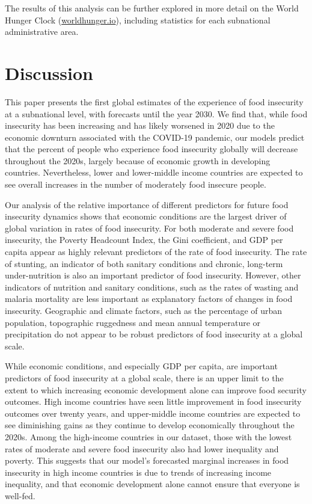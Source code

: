 \documentclass[titlepage]{article}
\begin{document}
The results of this analysis can be further explored in more detail on the World Hunger Clock (\href{https://worldhunger.io}{worldhunger.io}), including statistics for each subnational administrative area.

\section{Discussion}
This paper presents the first global estimates of the experience of food insecurity at a subnational level, with forecasts until the year 2030.  We find that, while food insecurity has been increasing and has likely worsened in 2020 due to the economic downturn associated with the COVID-19 pandemic, our models predict that the percent of people who experience food insecurity globally will decrease throughout the 2020s, largely because of economic growth in developing countries.  Nevertheless, lower and lower-middle income countries are expected to see overall increases in the number of moderately food insecure people. 

Our analysis of the relative importance of different predictors for future food insecurity dynamics shows that economic conditions are the largest driver of global variation in rates of food insecurity. For both moderate and severe food insecurity, the Poverty Headcount Index, the Gini coefficient, and GDP per capita appear as highly relevant predictors of the rate of food insecurity. The rate of stunting, an indicator of both sanitary conditions and chronic, long-term under-nutrition is also an important predictor of food insecurity. However, other indicators of nutrition and sanitary conditions, such as the rates of wasting and malaria mortality are less important as explanatory factors of changes in food insecurity. Geographic and climate factors, such as the percentage of urban population, topographic ruggedness and mean annual temperature or precipitation do not appear to be robust predictors of food insecurity at a global scale. 

While economic conditions, and especially GDP per capita, are important predictors of food insecurity at a global scale, there is an upper limit to the extent to which increasing economic development alone can improve food security outcomes.  High income countries have seen little improvement in food insecurity outcomes over twenty years, and upper-middle income countries are expected to see diminishing gains as they continue to develop economically throughout the 2020s.  Among the high-income countries in our dataset, those with the lowest rates of moderate and severe food insecurity also had lower inequality and poverty.  This suggests that our model's forecasted marginal increases in food insecurity in high income countries is due to trends of increasing income inequality, and that economic development alone cannot ensure that everyone is well-fed.
\end{document}
